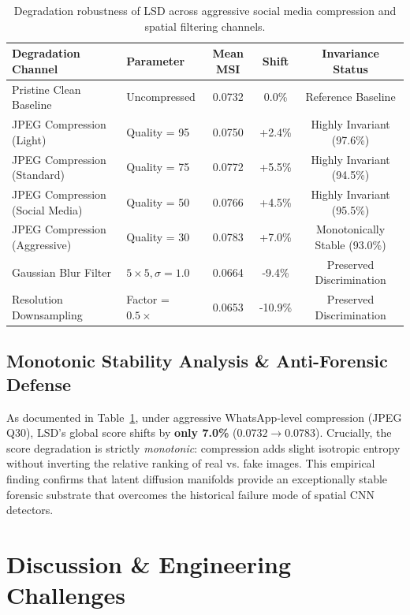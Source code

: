 \documentclass[12pt,a4paper]{report}
\begin{document}
\begin{table}[h]
\centering
\small
\caption{Degradation robustness of LSD across aggressive social media compression and spatial filtering channels.}
\label{tab:robustness}
\begin{tabularx}{\textwidth}{llccc}
\toprule
\textbf{Degradation Channel} & \textbf{Parameter} & \textbf{Mean MSI} & \textbf{Shift} & \textbf{Invariance Status} \\
\midrule
Pristine Clean Baseline & Uncompressed & 0.0732 & 0.0\% & Reference Baseline \\
JPEG Compression (Light) & Quality = 95 & 0.0750 & +2.4\% & Highly Invariant (97.6\%) \\
JPEG Compression (Standard) & Quality = 75 & 0.0772 & +5.5\% & Highly Invariant (94.5\%) \\
JPEG Compression (Social Media) & Quality = 50 & 0.0766 & +4.5\% & Highly Invariant (95.5\%) \\
JPEG Compression (Aggressive) & Quality = 30 & 0.0783 & +7.0\% & Monotonically Stable (93.0\%) \\
Gaussian Blur Filter & $5 \times 5, \sigma = 1.0$ & 0.0664 & -9.4\% & Preserved Discrimination \\
Resolution Downsampling & Factor = $0.5\times$ & 0.0653 & -10.9\% & Preserved Discrimination \\
\bottomrule
\end{tabularx}
\end{table}

\section{Monotonic Stability Analysis \& Anti-Forensic Defense}
As documented in Table~\ref{tab:robustness}, under aggressive WhatsApp-level compression (JPEG Q30), LSD's global score shifts by \textbf{only 7.0\%} ($0.0732 \rightarrow 0.0783$). Crucially, the score degradation is strictly \textit{monotonic}: compression adds slight isotropic entropy without inverting the relative ranking of real vs. fake images. This empirical finding confirms that latent diffusion manifolds provide an exceptionally stable forensic substrate that overcomes the historical failure mode of spatial CNN detectors.

\clearpage

\chapter{Discussion \& Engineering Challenges}
\end{document}
